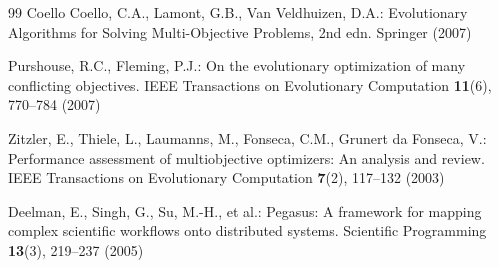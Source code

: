 \documentclass[preprint,12pt]{elsarticle}
\begin{document}
\begin{thebibliography}{99}
Coello Coello, C.A., Lamont, G.B., Van Veldhuizen, D.A.: Evolutionary Algorithms for Solving Multi-Objective Problems, 2nd edn. Springer (2007)

Purshouse, R.C., Fleming, P.J.: On the evolutionary optimization of many conflicting objectives. IEEE Transactions on Evolutionary Computation \textbf{11}(6), 770--784 (2007)

Zitzler, E., Thiele, L., Laumanns, M., Fonseca, C.M., Grunert da Fonseca, V.: Performance assessment of multiobjective optimizers: An analysis and review. IEEE Transactions on Evolutionary Computation \textbf{7}(2), 117--132 (2003)

Deelman, E., Singh, G., Su, M.-H., et al.: Pegasus: A framework for mapping complex scientific workflows onto distributed systems. Scientific Programming \textbf{13}(3), 219--237 (2005)


\end{thebibliography}
\end{document}
